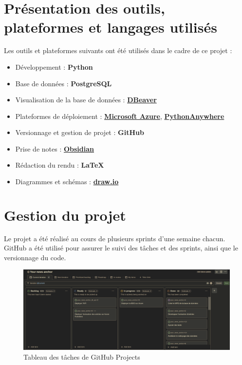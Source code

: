 \documentclass[french]{article}
\begin{document}
    \section{Présentation des outils, plateformes et langages utilisés}

    Les outils et plateformes suivants ont été utilisés dans le cadre de ce projet :
    \begin{itemize}
        \item Développement : \textbf{Python}
        \item Base de données : \textbf{PostgreSQL}
        \item Visualisation de la base de données : \textbf{\href{https://dbeaver.io/}{DBeaver}}
        \item Plateformes de déploiement : \textbf{\href{https://azure.microsoft.com/fr-fr}{Microsoft Azure}}, \textbf{\href{https://www.pythonanywhere.com/}{PythonAnywhere}}
        \item Versionnage et gestion de projet : \textbf{GitHub}
        \item Prise de notes : \textbf{\href{https://obsidian.md/}{Obsidian}}
        \item Rédaction du rendu : \textbf{\LaTeX} 
        \item Diagrammes et schémas : \textbf{\href{https://app.diagrams.net/}{draw.io}}
    \end{itemize}
    
    \section{Gestion du projet}
    Le projet a été réalisé au cours de plusieurs sprints d'une semaine chacun. GitHub a été utilisé pour assurer le suivi des tâches et des sprints, ainsi que le versionnage du code.
    
    \begin{figure}[h]
        \includegraphics[width=12cm]{gh_projects}
        \centering
        \caption{Tableau des tâches de GitHub Projects}
        \centering
    \end{figure}
\end{document}
